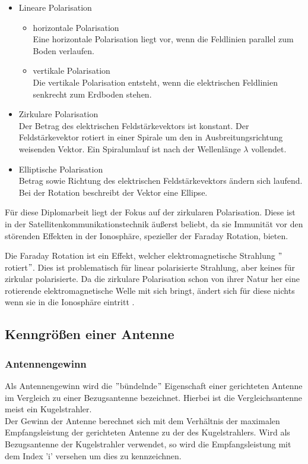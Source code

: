 \begin{itemize}
	\item Lineare Polarisation
	\begin{itemize}
		\item horizontale Polarisation\\
		Eine horizontale Polarisation liegt vor, wenn die Feldlinien parallel zum Boden verlaufen.
		\item vertikale Polarisation\\
		Die vertikale Polarisation entsteht, wenn die elektrischen Feldlinien senkrecht zum Erdboden stehen.
	\end{itemize}
	\item Zirkulare Polarisation\\
	Der Betrag des elektrischen Feldstärkevektors ist konstant. Der Feldstärkevektor rotiert in einer Spirale um den in Ausbreitungsrichtung weisenden Vektor. Ein Spiralumlauf ist nach der Wellenlänge $\lambda$ vollendet.
	\item Elliptische Polarisation\\
	Betrag sowie Richtung des elektrischen Feldstärkevektors ändern sich laufend. Bei der Rotation beschreibt der Vektor eine Ellipse.
\end{itemize}

Für diese Diplomarbeit liegt der Fokus auf der zirkularen Polarisation. Diese ist in der Satellitenkommunikationstechnik äußerst beliebt, da sie Immunität vor den störenden Effekten in der Ionosphäre, spezieller der Faraday Rotation, bieten.

Die Faraday Rotation ist ein Effekt, welcher elektromagnetische Strahlung $"$rotiert$"$. Dies ist problematisch für linear polarisierte Strahlung, aber keines für zirkular polarisierte. Da die zirkulare Polarisation schon von ihrer Natur her eine rotierende elektromagnetische Welle mit sich bringt, ändert sich für diese nichts wenn sie in die Ionosphäre eintritt \cite{takashi_encyclopedia_2003}.

\subsection{Kenngrößen einer Antenne}

\subsubsection{Antennengewinn}
Als Antennengewinn wird die $"$bündelnde$"$ Eigenschaft einer gerichteten Antenne im Vergleich zu einer Bezugsantenne bezeichnet. Hierbei ist die Vergleichsantenne meist ein Kugelstrahler.\\
\newline
Der Gewinn der Antenne berechnet sich mit dem Verhältnis der maximalen Empfangsleistung der gerichteten Antenne zu der des Kugelstrahlers. Wird als Bezugsantenne der Kugelstrahler verwendet, so wird die Empfangsleistung mit dem Index 'i' versehen um dies zu kennzeichnen.

